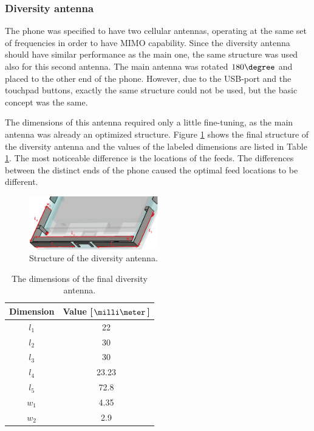 \subsubsection{Diversity antenna}
\label{sec:diversity}
The phone was specified to have two cellular antennas, operating at the same set of frequencies in order to have MIMO capability. Since the diversity antenna should have similar performance as the main one, the same structure was used also for this second antenna. The main antenna was rotated $180\degree$ and placed to the other end of the phone. However, due to the USB-port and the touchpad buttons, exactly the same structure could not be used, but the basic concept was the same.

The dimensions of this antenna required only a little fine-tuning, as the main antenna was already an optimized structure. Figure \ref{fig:div_final} shows the final structure of the diversity antenna and the values of the labeled dimensions are listed in Table \ref{tab:div_final}. The most noticeable difference is the locations of the feeds. The differences between the distinct ends of the phone caused the optimal feed locations to be different. 
\begin{figure}[H]
    \centering
    \includegraphics[width=0.5\textwidth]{img/diversity_final.eps}
    \caption{Structure of the diversity antenna.}
    \label{fig:div_final}
\end{figure}
\begin{table}[H]
    \centering
    \caption{The dimensions of the final diversity antenna.}
    \label{tab:div_final}
    \begin{tabular}{|c|c|}
        \hline
        \textbf{Dimension} & \textbf{Value [$\milli\meter$]}\\
        \hline
        $l_1$ & 22 \\
        \hline
        $l_2$ & 30\\
        \hline
        $l_3$ & 30 \\
        \hline
        $l_4$ & 23.23 \\
        \hline
        $l_5$ & 72.8 \\
        \hline
        $w_1$ & 4.35\\
        \hline
        $w_2$ & 2.9\\
        \hline
    \end{tabular}
\end{table}

